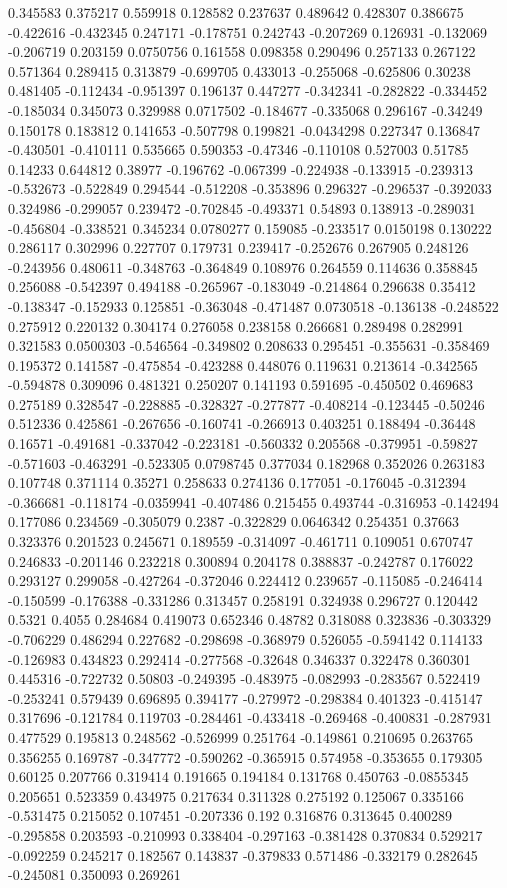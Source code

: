 0.345583 0.375217 0.559918 0.128582 0.237637 0.489642 0.428307 0.386675 -0.422616 -0.432345 0.247171 -0.178751 0.242743 -0.207269 0.126931 -0.132069 -0.206719 0.203159 0.0750756 0.161558 0.098358 0.290496 0.257133 0.267122 0.571364 0.289415 0.313879 -0.699705 0.433013 -0.255068 -0.625806 0.30238 0.481405 -0.112434 -0.951397 0.196137 0.447277 -0.342341 -0.282822 -0.334452 -0.185034 0.345073 0.329988 0.0717502 -0.184677 -0.335068 0.296167 -0.34249 0.150178 0.183812 0.141653 -0.507798 0.199821 -0.0434298 0.227347 0.136847 -0.430501 -0.410111 0.535665 0.590353 -0.47346 -0.110108 0.527003 0.51785 0.14233 0.644812 0.38977 -0.196762 -0.067399 -0.224938 -0.133915 -0.239313 -0.532673 -0.522849 0.294544 -0.512208 -0.353896 0.296327 -0.296537 -0.392033 0.324986 -0.299057 0.239472 -0.702845 -0.493371 0.54893 0.138913 -0.289031 -0.456804 -0.338521 0.345234 0.0780277 0.159085 -0.233517 0.0150198 0.130222 0.286117 0.302996 0.227707 0.179731 0.239417 -0.252676 0.267905 0.248126 -0.243956 0.480611 -0.348763 -0.364849 0.108976 0.264559 0.114636 0.358845 0.256088 -0.542397 0.494188 -0.265967 -0.183049 -0.214864 0.296638 0.35412 -0.138347 -0.152933 0.125851 -0.363048 -0.471487 0.0730518 -0.136138 -0.248522 0.275912 0.220132 0.304174 0.276058 0.238158 0.266681 0.289498 0.282991 0.321583 0.0500303 -0.546564 -0.349802 0.208633 0.295451 -0.355631 -0.358469 0.195372 0.141587 -0.475854 -0.423288 0.448076 0.119631 0.213614 -0.342565 -0.594878 0.309096 0.481321 0.250207 0.141193 0.591695 -0.450502 0.469683 0.275189 0.328547 -0.228885 -0.328327 -0.277877 -0.408214 -0.123445 -0.50246 0.512336 0.425861 -0.267656 -0.160741 -0.266913 0.403251 0.188494 -0.36448 0.16571 -0.491681 -0.337042 -0.223181 -0.560332 0.205568 -0.379951 -0.59827 -0.571603 -0.463291 -0.523305 0.0798745 0.377034 0.182968 0.352026 0.263183 0.107748 0.371114 0.35271 0.258633 0.274136 0.177051 -0.176045 -0.312394 -0.366681 -0.118174 -0.0359941 -0.407486 0.215455 0.493744 -0.316953 -0.142494 0.177086 0.234569 -0.305079 0.2387 -0.322829 0.0646342 0.254351 0.37663 0.323376 0.201523 0.245671 0.189559 -0.314097 -0.461711 0.109051 0.670747 0.246833 -0.201146 0.232218 0.300894 0.204178 0.388837 -0.242787 0.176022 0.293127 0.299058 -0.427264 -0.372046 0.224412 0.239657 -0.115085 -0.246414 -0.150599 -0.176388 -0.331286 0.313457 0.258191 0.324938 0.296727 0.120442 0.5321 0.4055 0.284684 0.419073 0.652346 0.48782 0.318088 0.323836 -0.303329 -0.706229 0.486294 0.227682 -0.298698 -0.368979 0.526055 -0.594142 0.114133 -0.126983 0.434823 0.292414 -0.277568 -0.32648 0.346337 0.322478 0.360301 0.445316 -0.722732 0.50803 -0.249395 -0.483975 -0.082993 -0.283567 0.522419 -0.253241 0.579439 0.696895 0.394177 -0.279972 -0.298384 0.401323 -0.415147 0.317696 -0.121784 0.119703 -0.284461 -0.433418 -0.269468 -0.400831 -0.287931 0.477529 0.195813 0.248562 -0.526999 0.251764 -0.149861 0.210695 0.263765 0.356255 0.169787 -0.347772 -0.590262 -0.365915 0.574958 -0.353655 0.179305 0.60125 0.207766 0.319414 0.191665 0.194184 0.131768 0.450763 -0.0855345 0.205651 0.523359 0.434975 0.217634 0.311328 0.275192 0.125067 0.335166 -0.531475 0.215052 0.107451 -0.207336 0.192 0.316876 0.313645 0.400289 -0.295858 0.203593 -0.210993 0.338404 -0.297163 -0.381428 0.370834 0.529217 -0.092259 0.245217 0.182567 0.143837 -0.379833 0.571486 -0.332179 0.282645 -0.245081 0.350093 0.269261 